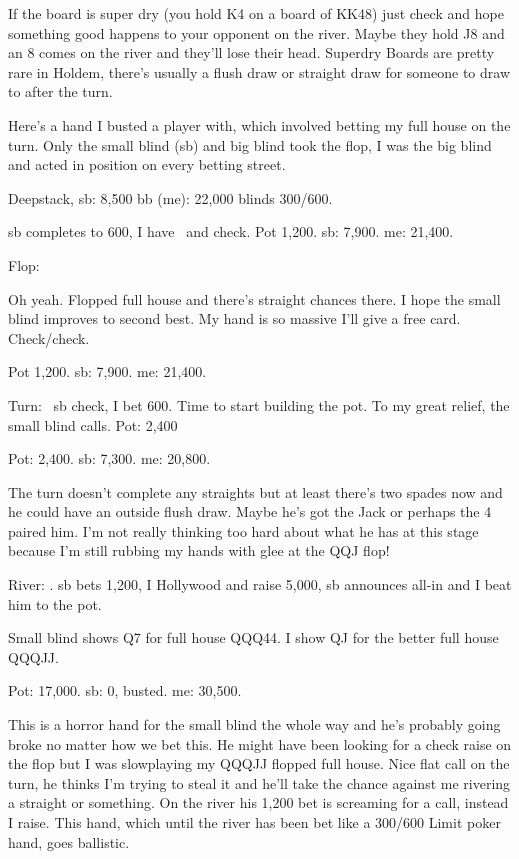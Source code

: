 If the board is super dry (you hold K4 on a board
of KK48) just check and hope something good happens
to your opponent on the river. Maybe they hold J8 and an 8 comes
on the river and they'll lose their head. Superdry Boards
are pretty rare in Holdem, there's usually a flush draw or straight draw
for someone to draw to after the turn.

Here's a hand I busted a player with, which involved betting my full
house on the turn. Only the small blind (sb) and big blind took the flop,
I was the big blind and acted in position on every betting
street.

Deepstack, sb: 8,500 bb (me): 22,000 blinds 300/600.

sb completes to 600, I have \Qc\Jh\ and check.
Pot 1,200. sb: 7,900. me: 21,400.

Flop: \Qs\Qh\Jd

Oh yeah. Flopped full house and there's straight chances there. I hope
the small blind improves to second best. My hand is so massive I'll give
a free card. Check/check.

Pot 1,200. sb: 7,900. me: 21,400.

Turn: \fours\ sb check, I bet 600. Time to start building the pot. To
my great relief, the small blind calls. Pot: 2,400

Pot: 2,400. sb: 7,300. me: 20,800.

The turn doesn't complete any straights but at least there's
two spades now and he could have an outside flush draw. Maybe he's
got the Jack or perhaps the 4 paired him. I'm not really thinking
too hard about what he has at this stage because I'm still rubbing my
hands with glee at the QQJ flop!

River: \fourc. sb bets 1,200, I Hollywood and raise 5,000, sb announces all-in
and I beat him to the pot.

Small blind shows Q7 for full house QQQ44. I show QJ for the better
full house QQQJJ.

Pot: 17,000. sb: 0, busted. me: 30,500.

This is a horror hand for the small blind the whole way and he's probably
going broke no matter how we bet this. He might have been looking for
a check raise on the flop but I was slowplaying my QQQJJ flopped full house.
Nice flat call on the turn, he thinks I'm trying to steal it and he'll take
the chance against me rivering a straight or something. On the river his
1,200 bet is screaming for a call, instead I raise. This hand, which until
the river has been bet like a 300/600 Limit poker hand, goes ballistic.

